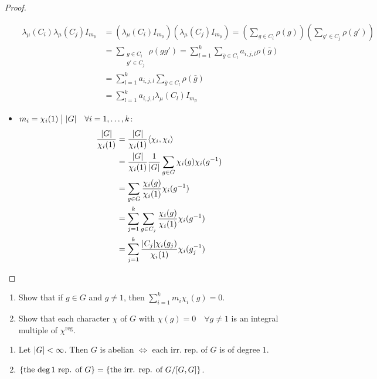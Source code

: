 \begin{theorem}[Divisibility]
\begin{proof}
\begin{itemize}
        \begin{align*}
          \lambda_\mu(C_i)\lambda_\mu(C_j) I_{m_\mu}
          &= \left(\lambda_\mu(C_i) I_{m_\mu}\right)
             \left(\lambda_\mu(C_j) I_{m_\mu}\right)
          = \left(\sum_{g\in C_i} \rho(g)\right)
             \left(\sum_{g'\in C_j} \rho(g')\right) \\
          &= \sum_{\substack{g\in C_i\\ g'\in C_j}} \rho(gg')
          = \sum_{l=1}^k \sum_{\bar{g}\in C_l} a_{i,j,l}\rho(\bar{g}) \\
          &= \sum_{l=1}^k a_{i,j,l} \sum_{\bar{g}\in C_l}\rho(\bar{g}) \\
          &= \sum_{l=1}^k a_{i,j,l} \lambda_\mu(C_l) I_{m_\mu}
       \end{align*}
     \item $m_i = \chi_i(1) \mathrel{\big|} \lvert G\rvert \quad \forall i = 1, \dots, k$:
       \begin{align*}
         \frac{\lvert G\rvert}{\chi_i(1)}
         &= \frac{\lvert G\rvert}{\chi_i(1)} \langle\chi_i, \chi_i\rangle \\
         &= \frac{\lvert G\rvert}{\chi_i(1)} \frac{1}{\lvert G\rvert} \sum_{g\in G}
         \chi_i(g) \chi_i(g^{-1}) \\
         &= \sum_{g\in G} \frac{\chi_i(g)}{\chi_i(1)} \chi_i(g^{-1}) \\
         &= \sum_{j=1}^k \sum_{g\in C_j} \frac{\chi_i(g)}{\chi_i(1)} \chi_i(g^{-1}) \\
         &= \sum_{j=1}^k \frac{\lvert C_j\rvert\chi_i(g_j)}{\chi_i(1)} \chi_i(g_j^{-1})
       \end{align*}
    \end{itemize}
  \end{proof}
\end{theorem}

\begin{exercise} \mbox{}
  \begin{enumerate}
    \item Show that if $g\in G$ and $g\ne 1$, then
      $\sum_{i=1}^k m_i\chi_i(g) = 0$.
    \item Show that each character $\chi$ of $G$ with $\chi(g) = 0 \quad
      \forall g \ne 1$ is an integral multiple of $\chi^\text{reg}$.
  \end{enumerate}
\end{exercise}

\begin{exercise} \mbox{}
  \begin{enumerate}
    \item Let $\lvert G\rvert < \infty$. Then $G$ is abelian $\iff$ each irr. rep.
      of $G$ is of degree $1$.
    \item $\{ \text{the $\deg 1$ rep. of $G$} \} = \{
      \text{the irr. rep. of~} {G}/{[G,G]} \}$.
  \end{enumerate}
\end{exercise}

